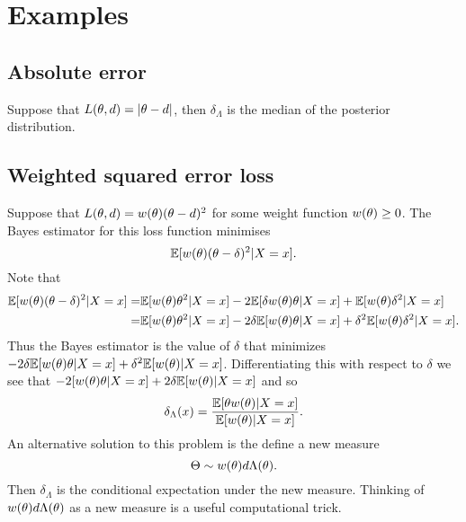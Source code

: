\section{Examples}
\subsection{Absolute error}
Suppose that $L({\theta},d) = {\left\lvert{\theta} - d\right\rvert}$, then $\delta_\Lambda$ is the median of the posterior distribution.
\subsection{Weighted squared error loss}
Suppose that $L({\theta},d) = w({\theta})({\theta} - d)^2$ for some weight function $w({\theta}) \ge 0$. The Bayes estimator for this loss function minimises
\[{\mathbb{E}}[w({\theta})({\theta}-\delta)^2|X=x]. \]
Note that
\begin{align*}
    {\mathbb{E}}[w({\theta})({\theta}-\delta)^2|X=x]=& {\mathbb{E}}[w({\theta}){\theta}^2|X=x]-2{\mathbb{E}}[\delta w({\theta}){\theta}|X=x] + {\mathbb{E}}[w({\theta})\delta^2|X=x]\\
    =& {\mathbb{E}}[w({\theta}){\theta}^2|X=x]-2\delta{\mathbb{E}}[w({\theta}){\theta}|X=x]+\delta^2{\mathbb{E}}[w({\theta})\delta^2|X=x].
\end{align*}
Thus the Bayes estimator is the value of $\delta$ that minimizes $-2\delta {\mathbb{E}}[w({\theta}){\theta}|X=x]+\delta^2{\mathbb{E}}[w({\theta})|X=x]$. Differentiating this with respect to $\delta$ we see that $-2[w({\theta}){\theta}|X=x]+2\delta {\mathbb{E}}[w({\theta})|X=x]$ and so
\[\delta_{\Lambda}(x) = \frac{{\mathbb{E}}[{\theta} w({\theta})|X=x]}{{\mathbb{E}}[w({\theta})|X=x]}. \]
An alternative solution to this problem is the define a new measure
\[\Theta \sim w({\theta})d\Lambda({\theta}). \]
Then $\delta_\Lambda$ is the conditional expectation under the new measure. Thinking of $w({\theta})d\Lambda({\theta})$ as a new measure is a useful computational trick.
